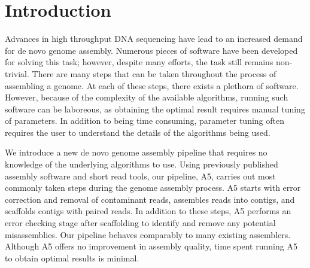 \documentclass{bioinfo}
\begin{document}
\section{Introduction}
Advances in high throughput DNA sequencing have lead to an increased demand for de novo 
genome assembly. Numerous pieces of software have been developed for solving this task; 
however, despite many efforts, the task still remains non-trivial. There are many 
steps that can be taken throughout the process of assembling a genome. At each of these steps,
there exists a plethora of software. However, because of the complexity of the available algorithms,
running such software can be laboreous, as obtaining the optimal result requires manual tuning of parameters.
In addition to being time consuming, parameter tuning often requires the user to understand the details
of the algorithms being used. 

We introduce a new de novo genome assembly pipeline that requires no knowledge
of the underlying algorithms to use. Using previously 
published assembly software and short read tools, our pipeline, A5, carries out
most commonly taken steps during the genome assembly process. A5 starts with error correction
and removal of contaminant reads, assembles reads into contigs, and scaffolds
contigs with paired reads. In addition to these steps, A5 performs an 
error checking stage after scaffolding to identify and remove any potential misassemblies. 
Our pipeline behaves comparably to many existing assemblers. Although A5 offers no improvement
in assembly quality, time spent running A5 to obtain optimal results is minimal. 

\end{document}

